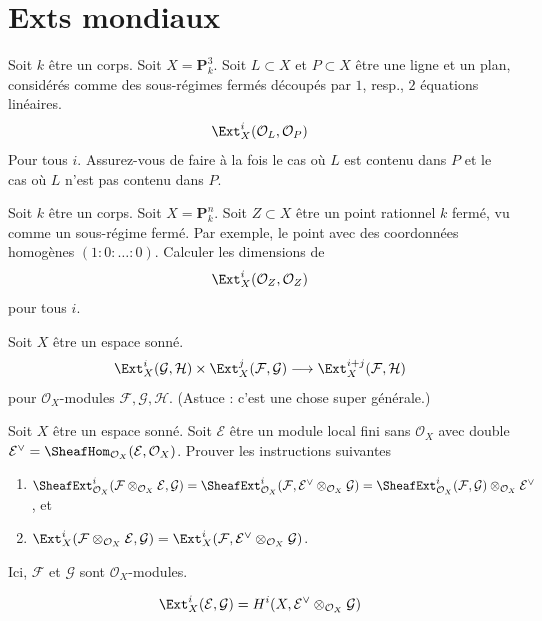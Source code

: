 \section{Exts mondiaux}
\label{section-global-exts}

\begin{exercise}
\label{exercise-ext-line-plane-p3}
Soit $k$ être un corps. Soit $X = \mathbf{P}^3_k$. Soit $L
\subset X$ et $P \subset X$ être une ligne et un plan,
considérés comme des sous-régimes fermés découpés par $1$, resp.,
$2$ équations linéaires.
$$
\Ext^i_X(\mathcal{O}_L, \mathcal{O}_P)
$$
Pour tous $i$.
Assurez-vous de faire à la fois le cas où $L$ est contenu dans $P$ et
le cas où $L$ n'est pas contenu dans $P$.
\end{exercise}

\begin{exercise}
\label{exercise-ext-point}
Soit $k$ être un corps. Soit $X = \mathbf{P}^n_k$. Soit $Z \subset
X$ être un point rationnel $k$ fermé, vu comme un sous-régime fermé.
Par exemple, le point avec des coordonnées homogènes $(1 :
0 : \ldots : 0)$. Calculer les dimensions de
$$
\Ext^i_X(\mathcal{O}_Z, \mathcal{O}_Z)
$$
pour tous $i$.
\end{exercise}

\begin{exercise}
\label{exercise-ext-pairings}
Soit $X$ être un espace sonné.
$$
\Ext^i_X(\mathcal{G}, \mathcal{H})
\times
\Ext^j_X(\mathcal{F}, \mathcal{G})
\longrightarrow
\Ext^{i + j}_X(\mathcal{F}, \mathcal{H})
$$
pour $\mathcal{O}_X$-modules $\mathcal{F}, \mathcal{G}, \mathcal{H}$. (Astuce : c'est
une chose super générale.)
\end{exercise}

\begin{exercise}
\label{exercise-move-out-locally-free}
Soit $X$ être un espace sonné. Soit $\mathcal{E}$
être un module local
fini sans $\mathcal{O}_X$ avec double $\mathcal{E}^\vee = \SheafHom_{\mathcal{O}_X}(\mathcal{E}, \mathcal{O}_X)$.
Prouver les instructions suivantes
\begin{enumerate}
\item $\SheafExt^i_{\mathcal{O}_X}(
\mathcal{F} \otimes_{\mathcal{O}_X} \mathcal{E}, \mathcal{G})
= \SheafExt^i_{\mathcal{O}_X}(
\mathcal{F},
\mathcal{E}^\vee \otimes_{\mathcal{O}_X} \mathcal{G}) =
\SheafExt^i_{\mathcal{O}_X}(
\mathcal{F}, \mathcal{G}) \otimes_{\mathcal{O}_X} \mathcal{E}^\vee$, et
\item
$\Ext^i_X( \mathcal{F} \otimes_{\mathcal{O}_X} \mathcal{E}, \mathcal{G})
=
\Ext^i_X(\mathcal{F}, \mathcal{E}^\vee \otimes_{\mathcal{O}_X} \mathcal{G})$.
\end{enumerate}
Ici, $\mathcal{F}$ et $\mathcal{G}$ sont $\mathcal{O}_X$-modules.

$$
\Ext^i_X(\mathcal{E}, \mathcal{G}) =
H^i(X, \mathcal{E}^\vee \otimes_{\mathcal{O}_X} \mathcal{G})
$$
\end{exercise}

